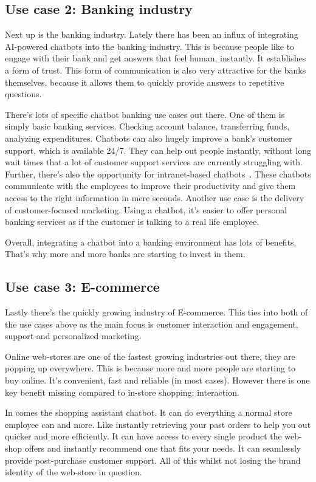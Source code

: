 \subsection{Use case 2: Banking industry}

Next up is the banking industry. Lately there has been an influx of integrating AI-powered chatbots into the banking industry. This is because people like to engage with their bank and get answers that feel human, instantly. It establishes a form of trust. This form of communication is also very attractive for the banks themselves, because it allows them to quickly provide answers to repetitive questions.

There's lots of specific chatbot banking use cases out there. One of them is simply basic banking services. Checking account balance, transferring funds, analyzing expenditures. Chatbots can also hugely improve a bank's customer support, which is available 24/7. They can help out people instantly, without long wait times that a lot of customer support services are currently struggling with. Further, there's also the opportunity for intranet-based chatbots~\cite{intranet-chabot}. These chatbots communicate with the employees to improve their productivity and give them access to the right information in mere seconds. Another use case is the delivery of customer-focused marketing. Using a chatbot, it's easier to offer personal banking services as if the customer is talking to a real life employee.

Overall, integrating a chatbot into a banking environment has lots of benefits. That's why more and more banks are starting to invest in them.

\subsection{Use case 3: E-commerce}

Lastly there's the quickly growing industry of E-commerce. This ties into both of the use cases above as the main focus is customer interaction and engagement, support and personalized marketing.

Online web-stores are one of the fastest growing industries out there, they are popping up everywhere. This is because more and more people are starting to buy online. It's convenient, fast and reliable (in most cases). However there is one key benefit missing compared to in-store shopping; interaction.

In comes the shopping assistant chatbot. It can do everything a normal store employee can and more. Like instantly retrieving your past orders to help you out quicker and more efficiently. It can have access to every single product the web-shop offers and instantly recommend one that fits your needs. It can seamlessly provide post-purchase customer support. All of this whilst not losing the brand identity of the web-store in question.

